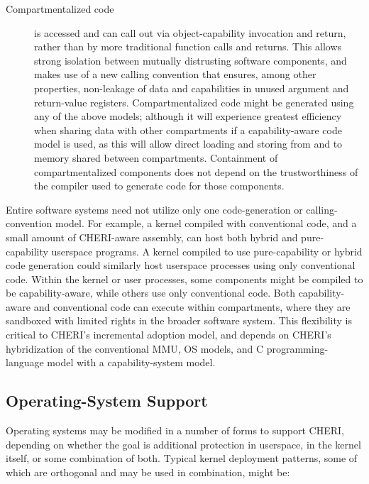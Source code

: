\begin{description}
\item[Compartmentalized code] is accessed and can call out via
  object-capability invocation and return, rather than by more traditional
  function calls and returns.
  This allows strong isolation between mutually distrusting software
  components, and makes use of a new calling convention that ensures, among
  other properties, non-leakage of data and capabilities in unused argument
  and return-value registers.
  Compartmentalized code might be generated using any of the above models;
  although it will experience greatest efficiency when sharing data with other
  compartments if a capability-aware code model is used, as this will allow
  direct loading and storing from and to memory shared between compartments.
  Containment of compartmentalized components does not depend on the
  trustworthiness of the compiler used to generate code for those components.
\end{description}

Entire software systems need not utilize only one code-generation or
calling-convention model.  For example, a kernel compiled with conventional
code, and a small amount of CHERI-aware assembly, can host both hybrid
and pure-capability userspace programs.
A kernel compiled to use pure-capability or hybrid code generation could
similarly host userspace processes using only conventional code.
Within the kernel or user processes, some components might be compiled to be
capability-aware, while others use only conventional code.
Both capability-aware and conventional code can execute within
compartments, where they are sandboxed with limited rights in the broader
software system.
This flexibility is critical to CHERI's incremental adoption model, and
depends on CHERI's hybridization of the conventional MMU, OS models, and C
programming-language model with a capability-system model.

\subsection{Operating-System Support}

Operating systems may be modified in a number of forms to support CHERI,
depending on whether the goal is additional protection in userspace, in the
kernel itself, or some combination of both.
Typical kernel deployment patterns, some of which are orthogonal and may be
used in combination, might be:

